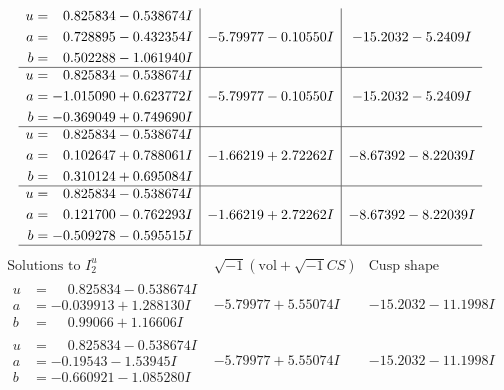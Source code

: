 \documentclass[1p]{elsarticle_modified}
\theoremstyle{definition}
\newcommand{\I}{\sqrt{-1}}
\begin{document}
$$\begin{array}{c|c|c}
\begin{aligned}
u &= \phantom{-}0.825834 - 0.538674 I \\
a &= \phantom{-}0.728895 - 0.432354 I \\
b &= \phantom{-}0.502288 - 1.061940 I\end{aligned}
 & -5.79977 - 0.10550 I & -15.2032 - 5.2409 I \\ \hline\begin{aligned}
u &= \phantom{-}0.825834 - 0.538674 I \\
a &= -1.015090 + 0.623772 I \\
b &= -0.369049 + 0.749690 I\end{aligned}
 & -5.79977 - 0.10550 I & -15.2032 - 5.2409 I \\ \hline\begin{aligned}
u &= \phantom{-}0.825834 - 0.538674 I \\
a &= \phantom{-}0.102647 + 0.788061 I \\
b &= \phantom{-}0.310124 + 0.695084 I\end{aligned}
 & -1.66219 + 2.72262 I & -8.67392 - 8.22039 I \\ \hline\begin{aligned}
u &= \phantom{-}0.825834 - 0.538674 I \\
a &= \phantom{-}0.121700 - 0.762293 I \\
b &= -0.509278 - 0.595515 I\end{aligned}
 & -1.66219 + 2.72262 I & -8.67392 - 8.22039 I\\
 \hline 
 \end{array}$$\newpage$$\begin{array}{c|c|c}  
\text{Solutions to }I^u_{2}& \I (\text{vol} + \sqrt{-1}CS) & \text{Cusp shape}\\
 \hline 
\begin{aligned}
u &= \phantom{-}0.825834 - 0.538674 I \\
a &= -0.039913 + 1.288130 I \\
b &= \phantom{-}0.99066 + 1.16606 I\end{aligned}
 & -5.79977 + 5.55074 I & -15.2032 - 11.1998 I \\ \hline\begin{aligned}
u &= \phantom{-}0.825834 - 0.538674 I \\
a &= -0.19543 - 1.53945 I \\
b &= -0.660921 - 1.085280 I\end{aligned}
 & -5.79977 + 5.55074 I & -15.2032 - 11.1998 I \\ \hline\begin{aligned}

\end{aligned}
\end{array}$$
\end{document}
